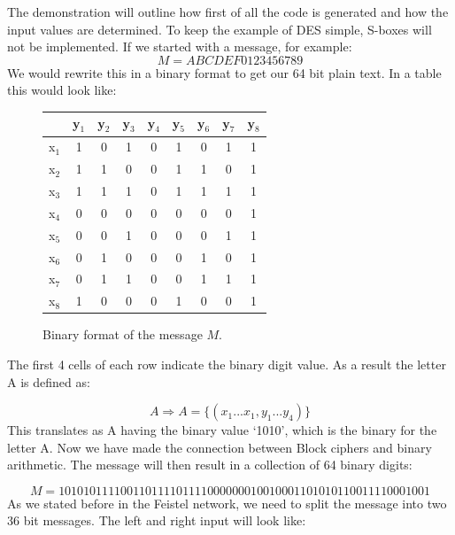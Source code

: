 \documentclass[11pt,a4paper, notitlepage]{report}
\begin{document}
The demonstration will outline how first of all the code is generated and how the input values are determined. To keep the example of DES simple, S-boxes will not be implemented. If we started with a message, for example:
\begin{displaymath}
M = ABCDEF0123456789
\end{displaymath}
We would rewrite this in a binary format to get our 64 bit plain text. In a table this would look like:





\begin{figure}[H]
\centering
\label{tab:BFormat}
\begin{tabular}{ |c|c|c|c|c|c|c|c|c| }
\hline
  {} & y$_{1}$ & y$_{2}$ & y$_{3}$ & y$_{4}$ & y$_{5}$ & y$_{6}$ & y$_{7}$ & y$_{8}$ \\ \hline
  x$_{1}$ & 1 & 0 & 1 & 0 & 1 & 0 & 1 & 1 \\ \hline
  x$_{2}$ & 1 & 1 & 0 & 0 & 1 & 1 & 0 & 1 \\ \hline
  x$_{3}$ & 1 & 1 & 1 & 0 & 1 & 1 & 1 & 1 \\ \hline
  x$_{4}$ & 0 & 0 & 0 & 0 & 0 & 0 & 0 & 1 \\ \hline
  x$_{5}$ & 0 & 0 & 1 & 0 & 0 & 0 & 1 & 1 \\ \hline
  x$_{6}$ & 0 & 1 & 0 & 0 & 0 & 1 & 0 & 1 \\ \hline
  x$_{7}$ & 0 & 1 & 1 & 0 & 0 & 1 & 1 & 1 \\ \hline
  x$_{8}$ & 1 & 0 & 0 & 0 & 1 & 0 & 0 & 1 \\ \hline
\end{tabular}
\caption{Binary format of the message $M$.}
\end{figure}

The first 4 cells of each row indicate the binary digit value. As a result the letter A is defined as:

\begin{displaymath}
A \Rightarrow A = \{(x_{1}...x_{1}, y_{1}...y_{4})\}
\end{displaymath}
This translates as A having the binary value `1010', which is the binary for the letter A. Now we have made the connection between Block ciphers and binary arithmetic. The message will then result in a collection of 64 binary digits:


\begin{displaymath}
M = 1010 1011 1100 1101 1110 1111 0000 0001 0010 0011 0101 0110 0111 1000 1001
\end{displaymath}
As we stated before in the Feistel network, we need to split the message into two 36 bit messages. The left and right input will look like:
\end{document}
